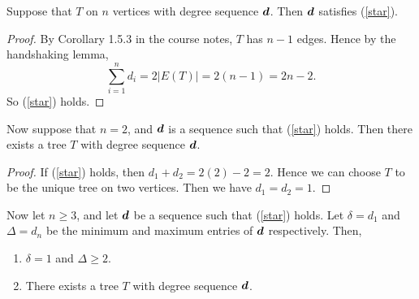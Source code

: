 \documentclass{unswmaths}
\begin{document}
\begin{proposition}[Part (a)]
\label{2a}
    Suppose that $T$ on $n$ vertices with degree sequence $\boldsymbol{d}$.
    Then $\boldsymbol{d}$ satisfies (\ref{star}).
\end{proposition}
\begin{proof}
    By Corollary 1.5.3 in the course notes, $T$ has $n-1$ edges.
    Hence by the handshaking lemma,
    \begin{equation}
        \sum_{i=1}^n d_i = 2|E(T)| = 2(n-1) = 2n-2.
    \end{equation}
    So (\ref{star}) holds.
\end{proof} 
\begin{proposition}[Part (b)]
\label{2b}
    Now suppose that $n = 2$, and $\boldsymbol{d}$ is a sequence such that
    (\ref{star}) holds. Then there exists a tree $T$ with degree
    sequence $\boldsymbol{d}$.
\end{proposition}
\begin{proof}
    If (\ref{star}) holds, then $d_1+d_2 = 2(2)-2 = 2$. Hence
    we can choose $T$ to be the unique tree on two vertices. Then
    we have $d_1 = d_2 = 1$.
\end{proof}
\begin{proposition}[Part (c)]
\label{2c}
    Now let $n \geq 3$, and let $\boldsymbol{d}$ be a sequence such that (\ref{star}) holds.
    Let $\delta = d_1$ and $\Delta = d_n$ be the minimum and maximum entries of $\boldsymbol{d}$
    respectively. Then,
    \begin{enumerate}
        \item{} $\delta = 1$ and $\Delta \geq 2$.
        \item{} There exists a tree $T$ with degree sequence $\boldsymbol{d}$.
    \end{enumerate}
\end{proposition}
\end{document}

